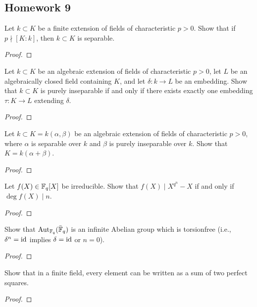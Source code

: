 \subsection{Homework 9}
\begin{problem}
  Let $k\subset K$ be a finite extension of fields of characteristic
  $p>0$. Show that if $p\nmid [K:k]$, then $k\subset K$ is separable.
\end{problem}
\begin{proof}
\end{proof}

\begin{problem}
  Let $k\subset K$ be an algebraic extension of fields of characteristic
  $p>0$, let $L$ be an algebraically closed field containing $K$, and let
  $\delta\colon k\to L$ be an embedding. Show that $k\subset K$ is purely
  inseparable if and only if there exists exactly one embedding
  $\tau\colon K\to L$ extending $\delta$.
\end{problem}
\begin{proof}
\end{proof}

\begin{problem}
  Let $k\subset K=k(\alpha,\beta)$ be an algebraic extension of fields of
  characteristic $p>0$, where $\alpha$ is separable over $k$ and $\beta$ is
  purely inseparable over $k$. Show that $K=k(\alpha+\beta)$.
\end{problem}
\begin{proof}
\end{proof}

\begin{problem}
  Let $f(X)\in\mathbb{F}_q[X]$ be irreducible. Show that $f(X)\mid X^{q^n}-X$ if
  and only if $\deg f(X)\mid n$.
\end{problem}
\begin{proof}
\end{proof}

\begin{problem}
  Show that $\operatorname{Aut}_{\mathbb{F}_q}(\bar{\mathbb{F}}_q)$ is an infinite Abelian group which
  is torsionfree (i.e., $\delta^n=\operatorname{id}$ implies $\delta=\operatorname{id}$ or $n=0$).
\end{problem}
\begin{proof}
\end{proof}

\begin{problem}
  Show that in a finite field, every element can be written as a sum of two
  perfect squares.
\end{problem}
\begin{proof}
\end{proof}

